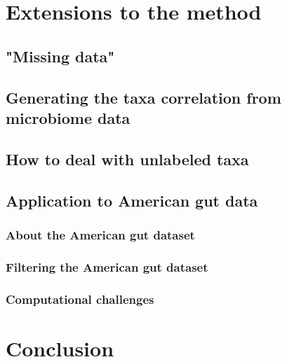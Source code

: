 \documentclass[12pt]{article}
\begin{document}
\section{Extensions to the method}
\subsection{"Missing data"}
\subsection{Generating the taxa correlation from microbiome data}
\subsection{How to deal with unlabeled taxa}
\subsection{Application to American gut data}
\subsubsection{About the American gut dataset}
\subsubsection{Filtering the American gut dataset}
\subsubsection{Computational challenges}


\section{Conclusion}








\printbibliography
\end{document}
